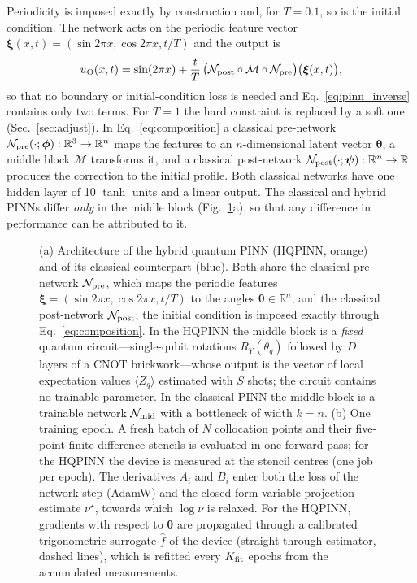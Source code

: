 \documentclass[floatfix,aps,pra,twocolumn,showpacs,superscriptaddress,10pt,nofootinbib]{revtex4-2}
\begin{document}
Periodicity is imposed exactly by construction and, for $T=0.1$, so is the initial condition. The network acts on the periodic feature vector $\bm\xi(x,t)=(\sin2\pi x,\cos2\pi x,t/T)$ and the output is
\begin{equation}
  u_\Theta(x,t)=\sin(2\pi x)+\frac{t}{T}\,\big(\mathcal N_{\rm post}\circ\mathcal M\circ\mathcal N_{\rm pre}\big)\big(\bm\xi(x,t)\big),
  \label{eq:composition}
\end{equation}
so that no boundary or initial-condition loss is needed and Eq.~\eqref{eq:pinn_inverse} contains only two terms. For $T=1$ the hard constraint is replaced by a soft one (Sec.~\ref{sec:adjust}). In Eq.~\eqref{eq:composition} a classical pre-network $\mathcal N_{\rm pre}(\cdot;\bm\phi):\mathbb R^3\to\mathbb R^n$ maps the features to an $n$-dimensional latent vector $\bm\theta$, a middle block $\mathcal M$ transforms it, and a classical post-network $\mathcal N_{\rm post}(\cdot;\bm\psi):\mathbb R^n\to\mathbb R$ produces the correction to the initial profile. Both classical networks have one hidden layer of 10 $\tanh$ units and a linear output. The classical and hybrid PINNs differ \emph{only} in the middle block (Fig.~\ref{fig:schematic}a), so that any difference in performance can be attributed to it.

\begin{figure}[t]
  \centering
  \resizebox{\textwidth}{!}{}
  \caption{\justifying
  (a) Architecture of the hybrid quantum PINN (HQPINN, orange) and of its classical counterpart (blue). Both share the classical pre-network $\mathcal N_{\rm pre}$, which maps the periodic features $\bm\xi=(\sin2\pi x,\cos2\pi x,t/T)$ to the angles $\bm\theta\in\mathbb R^n$, and the classical post-network $\mathcal N_{\rm post}$; the initial condition is imposed exactly through Eq.~\eqref{eq:composition}. In the HQPINN the middle block is a \emph{fixed} quantum circuit---single-qubit rotations $R_Y(\theta_q)$ followed by $D$ layers of a CNOT brickwork---whose output is the vector of local expectation values $\langle Z_q\rangle$ estimated with $S$ shots; the circuit contains no trainable parameter. In the classical PINN the middle block is a trainable network $\mathcal N_{\rm mid}$ with a bottleneck of width $k=n$.
  (b) One training epoch. A fresh batch of $N$ collocation points and their five-point finite-difference stencils is evaluated in one forward pass; for the HQPINN the device is measured at the stencil centres (one job per epoch). The derivatives $A_i$ and $B_i$ enter both the loss of the network step (AdamW) and the closed-form variable-projection estimate $\nu^\star$, towards which $\log\nu$ is relaxed. For the HQPINN, gradients with respect to $\bm\theta$ are propagated through a calibrated trigonometric surrogate $\hat f$ of the device (straight-through estimator, dashed lines), which is refitted every $K_{\rm fit}$ epochs from the accumulated measurements.}
  \label{fig:schematic}
\end{figure}
\end{document}

